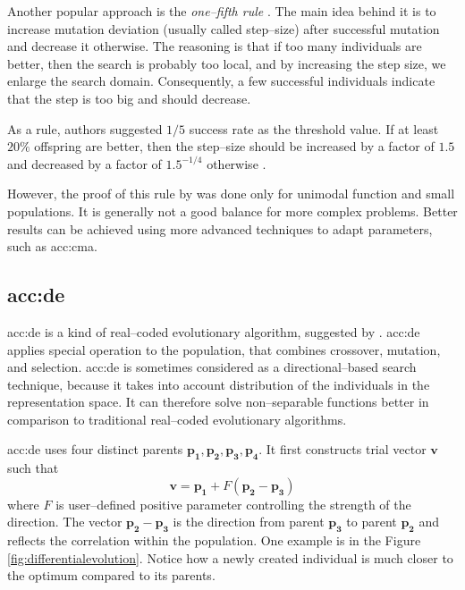 Another popular approach is the \emph{one--fifth rule} \citep{onefifthrule}. The main idea behind it is to increase mutation deviation (usually called step--size) after successful mutation and decrease it otherwise. The reasoning is that if too many individuals are better, then the search is probably too local, and by increasing the step size, we enlarge the search domain. Consequently, a few successful individuals indicate that the step is too big and should decrease.

As a rule, authors \citet*{onefifthruleoriginal} suggested $1/5$ success rate as the threshold value. If at least $20\%$ offspring are better, then the step--size should be increased by a factor of $1.5$ and decreased by a factor of $1.5^{-1/4}$ otherwise \citep{onefifthrule}.

However, the proof of this rule by \citeauthor*{onefifthruleoriginal} was done only for unimodal function and small populations. It is generally not a good balance for more complex problems. Better results can be achieved using more advanced techniques to adapt parameters, such as \acrshort{acc:cma}.

\subsection{\texorpdfstring{\acrlong*{acc:de}}{Differential evolution}}

\acrfull{acc:de} is a kind of real--coded evolutionary algorithm, suggested by \citet*{differentialevolutionoriginal}. \acrshort{acc:de} applies special operation to the population, that combines crossover, mutation, and selection. \acrshort{acc:de} is sometimes considered as a directional--based search technique, because it takes into account distribution of the individuals in the representation space. It can therefore solve non--separable functions better in comparison to traditional real--coded evolutionary algorithms.

\acrshort{acc:de} uses four distinct parents $\mathbf{p_1}, \mathbf{p_2}, \mathbf{p_3}, \mathbf{p_4}$. It first constructs trial vector $\mathbf{v}$ such that
$$
\mathbf{v} = \mathbf{p_1} + F\left( \mathbf{p_2} - \mathbf{p_3} \right)
$$
where $F$ is user--defined positive parameter controlling the strength of the direction. The vector $\mathbf{p_2} - \mathbf{p_3}$ is the direction from parent $\mathbf{p_3}$ to parent $\mathbf{p_2}$ and reflects the correlation within the population. One example is in the Figure \ref{fig:differentialevolution}. Notice how a newly created individual is much closer to the optimum compared to its parents.

